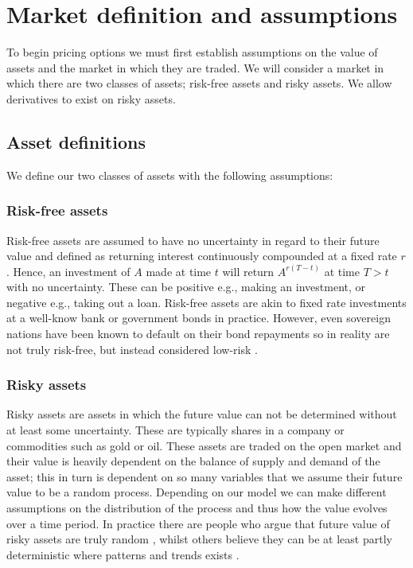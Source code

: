 \section{Market definition and assumptions}

To begin pricing options we must first establish assumptions on the value of assets and the market in which they are traded. We will consider a market in which there are two classes of assets; risk-free assets and risky assets. We allow derivatives to exist on risky assets.

\subsection{Asset definitions}

We define our two classes of assets with the following assumptions:

\subsubsection{Risk-free assets}

Risk-free assets are assumed to have no uncertainty in regard to their future value and defined as returning interest continuously compounded at a fixed rate $r$. Hence, an investment of $A$ made at time $t$ will return $A^{r\left(T-t\right)}$ at time $T>t$ with no uncertainty. These can be positive e.g., making an investment, or negative e.g., taking out a loan. Risk-free assets are akin to fixed rate investments at a well-know bank or government bonds in practice. However, even sovereign nations have been known to default on their bond repayments so in reality are not truly risk-free, but instead considered low-risk \cite{kitanov2015risk}.

\subsubsection{Risky assets}

Risky assets are assets in which the future value can not be determined without at least some uncertainty. These are typically shares in a company or commodities such as gold or oil. These assets are traded on the open market and their value is heavily dependent on the balance of supply and demand of the asset; this in turn is dependent on so many variables that we assume their future value to be a random process. Depending on our model we can make different assumptions on the distribution of the process and thus how the value evolves over a time period. In practice there are people who argue that future value of risky assets are truly random \cite{RandomWalkFama}, whilst others believe they can be at least partly deterministic where patterns and trends exists \cite{shiller1985testing}.

